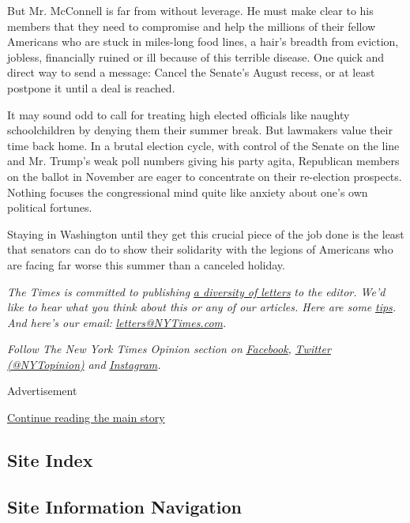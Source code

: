 But Mr. McConnell is far from without leverage. He must make clear to
his members that they need to compromise and help the millions of their
fellow Americans who are stuck in miles-long food lines, a hair's
breadth from eviction, jobless, financially ruined or ill because of
this terrible disease. One quick and direct way to send a message:
Cancel the Senate's August recess, or at least postpone it until a deal
is reached.

It may sound odd to call for treating high elected officials like
naughty schoolchildren by denying them their summer break. But lawmakers
value their time back home. In a brutal election cycle, with control of
the Senate on the line and Mr. Trump's weak poll numbers giving his
party agita, Republican members on the ballot in November are eager to
concentrate on their re-election prospects. Nothing focuses the
congressional mind quite like anxiety about one's own political
fortunes.

Staying in Washington until they get this crucial piece of the job done
is the least that senators can do to show their solidarity with the
legions of Americans who are facing far worse this summer than a
canceled holiday.

\emph{The Times is committed to publishing}
\href{https://www.nytimes3xbfgragh.onion/2019/01/31/opinion/letters/letters-to-editor-new-york-times-women.html}{\emph{a
diversity of letters}} \emph{to the editor. We'd like to hear what you
think about this or any of our articles. Here are some}
\href{https://help.nytimes3xbfgragh.onion/hc/en-us/articles/115014925288-How-to-submit-a-letter-to-the-editor}{\emph{tips}}\emph{.
And here's our email:}
\href{mailto:letters@NYTimes.com}{\emph{letters@NYTimes.com}}\emph{.}

\emph{Follow The New York Times Opinion section on}
\href{https://www.facebookcorewwwi.onion/nytopinion}{\emph{Facebook}}\emph{,}
\href{http://twitter.com/NYTOpinion}{\emph{Twitter (@NYTopinion)}}
\emph{and}
\href{https://www.instagram.com/nytopinion/}{\emph{Instagram}}\emph{.}

Advertisement

\protect\hyperlink{after-bottom}{Continue reading the main story}

\hypertarget{site-index}{%
\subsection{Site Index}\label{site-index}}

\hypertarget{site-information-navigation}{%
\subsection{Site Information
Navigation}\label{site-information-navigation}}

